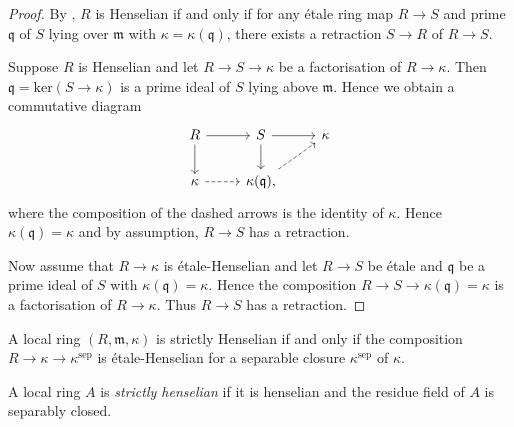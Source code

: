 \begin{proof}
    By {\cite[\href{https://stacks.math.columbia.edu/tag/04GG}{Tag 04GG}]{stacks-project}}, $R$ is Henselian if and only if
    for any étale ring map $R \to S$ and prime $\mathfrak{q}$ of $S$ lying over $\mathfrak{m}$ with $\kappa = \kappa(\mathfrak{q})$,
    there exists a retraction $S \to R$ of $R \to S$.

    Suppose $R$ is Henselian and let $R \to S \to \kappa$ be a factorisation of $R \to \kappa$. Then
    $\mathfrak{q} = \mathrm{ker}(S \to \kappa)$ is a prime ideal of $S$ lying above $\mathfrak{m}$. Hence we obtain a commutative
    diagram
    \[
        \begin{tikzcd}
        R \arrow{r} \arrow{d} & S \arrow{r} \arrow{d} & \kappa \\
        \kappa \arrow[dashed]{r} & \kappa(\mathfrak{q}) \arrow[dashed]{ur},
        \end{tikzcd}
    \] where the composition of the dashed arrows is the identity of $\kappa$. Hence $\kappa(\mathfrak{q}) = \kappa$ and by assumption,
    $R \to S$ has a retraction.

    Now assume that $R \to \kappa$ is étale-Henselian and let $R \to S$ be étale and $\mathfrak{q}$ be a prime ideal of $S$ with
    $\kappa(\mathfrak{q}) = \kappa$. Hence the composition $R \to S \to \kappa(\mathfrak{q}) = \kappa$ is a factorisation
    of $R \to \kappa$. Thus $R \to S$ has a retraction.
\end{proof}

\begin{example}
    A local ring $(R, \mathfrak{m}, \kappa)$ is strictly Henselian if and only if the composition $R \to \kappa \to \kappa^\mathrm{sep}$ is
    étale-Henselian for a separable closure $\kappa^{\mathrm{sep}}$ of $\kappa$.
\end{example}

\begin{definition}
    \label{def:strictly-henselian-local-ring}
    A local ring \(A\) is \emph{strictly henselian} if it is henselian and the residue field of \(A\) is
    separably closed.
\end{definition}


